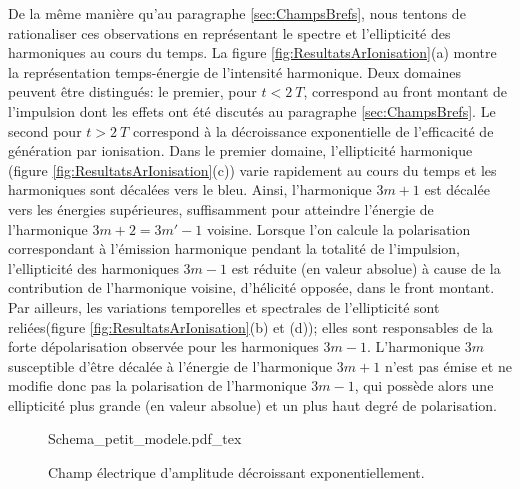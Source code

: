 De la même manière qu'au paragraphe \ref{sec:ChampsBrefs}, nous tentons de rationaliser ces observations en représentant le spectre et l'ellipticité des harmoniques au cours du temps. La figure \ref{fig:ResultatsArIonisation}(a) montre la représentation temps-énergie de l'intensité harmonique. Deux domaines peuvent être distingués: le premier, pour $t < 2\: T$, correspond au front montant de l'impulsion dont les effets ont été discutés au paragraphe \ref{sec:ChampsBrefs}. Le second pour $t > 2 \: T$ correspond à la décroissance exponentielle de l'efficacité de génération par ionisation. Dans le premier domaine, l'ellipticité harmonique (figure \ref{fig:ResultatsArIonisation}(c)) varie rapidement au cours du temps et les harmoniques sont décalées vers le bleu. Ainsi, l'harmonique $3m+1$ est décalée vers les énergies supérieures, suffisamment pour atteindre l'énergie de l'harmonique $3m+2 = 3m'-1$ voisine. Lorsque l'on calcule la polarisation correspondant à l'émission harmonique pendant la totalité de l'impulsion, l'ellipticité des harmoniques $3m-1$ est réduite (en valeur absolue) à cause de la contribution de l'harmonique voisine, d'hélicité opposée, dans le front montant. Par ailleurs, les variations temporelles et spectrales de l'ellipticité sont reliées(figure \ref{fig:ResultatsArIonisation}(b) et (d)); elles sont responsables de la forte dépolarisation observée pour les harmoniques $3m-1$. L'harmonique $3m$ susceptible d'être décalée à l'énergie de l'harmonique $3m+1$ n'est pas émise et ne modifie donc pas la polarisation de l'harmonique $3m-1$, qui possède alors une ellipticité plus grande (en valeur absolue) et un plus haut degré de polarisation. 

\begin{figure}[h]
\centering
\def\svgwidth{0.5\textwidth}
{Schema_petit_modele.pdf_tex}
\caption{Champ électrique d'amplitude décroissant exponentiellement.}
\label{fig:Schema_petit_modele}
\end{figure}

